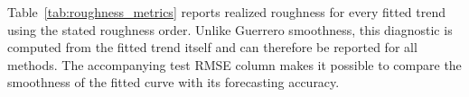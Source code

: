 \begin{table}[htbp]
  \centering
  \caption{Selected or fixed model parameters.}
  \label{tab:model_parameters}
  
\end{table}

Table~\ref{tab:roughness_metrics} reports realized roughness for every fitted
trend using the stated roughness order. Unlike Guerrero smoothness, this
diagnostic is computed from the fitted trend itself and can therefore be
reported for all methods. The accompanying test RMSE column makes it possible
to compare the smoothness of the fitted curve with its forecasting accuracy.

\begin{table}[htbp]
  \centering
  \caption{Realized roughness diagnostics and test RMSE.}
  \label{tab:roughness_metrics}
  
\end{table}
